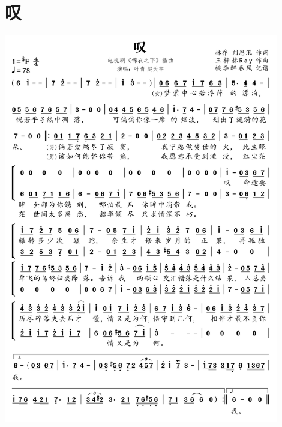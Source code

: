 \documentclass[cn,pad,twocol]{elegantbook}
\begin{document}
\section{叹} \includegraphics[width=0.9\textwidth]{rpi400/20210212叹.png}
\end{document}
